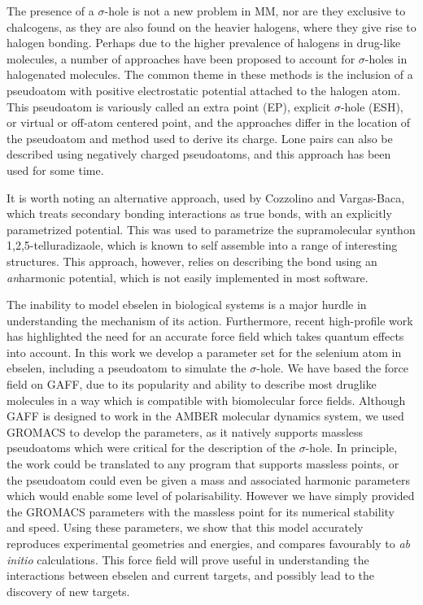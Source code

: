 \begin{refsection}
The presence of a $\sigma$-hole is not a new problem in MM, nor are they exclusive to chalcogens, as they are also found on the heavier halogens, where they give rise to halogen bonding.\autocite{Clark2007}
Perhaps due to the higher prevalence of halogens in drug-like molecules, a number of approaches have been proposed to account for $\sigma$-holes in halogenated molecules.
The common theme in these methods is the inclusion of a pseudoatom with positive electrostatic potential attached to the halogen atom.
This pseudoatom is variously called an extra point (EP), explicit $\sigma$-hole (ESH), or virtual or off-atom centered point, and the approaches differ in the location of the pseudoatom and method used to derive its charge.\autocite{Renidine2011,Ibrahim2011,Hobza2012,Harder2016}
Lone pairs can also be described using negatively charged pseudoatoms, and this approach has been used for some time.\autocite{Dixon1997,Cieplak2001,Harder2016}

It is worth noting an alternative approach, used by Cozzolino and Vargas-Baca, which treats secondary bonding interactions as true bonds, with an explicitly parametrized potential.\autocite{Cozzolino2011}
This was used to parametrize the supramolecular synthon 1,2,5-tellura\-dizaole, which is known to self assemble into a range of interesting structures.
This approach, however, relies on describing the bond using an \emph{an}harmonic potential, which is not easily implemented in most software.

The inability to model ebselen in biological systems is a major hurdle in understanding the mechanism of its action.
Furthermore, recent high-profile work has highlighted the need for an accurate force field which takes quantum effects into account.\autocite{Weglarz-Tomczak2021,Menendez2020}
In this work we develop a parameter set for the selenium atom in ebselen, including a pseudoatom to simulate the $\sigma$-hole.
We have based the force field on GAFF, due to its popularity and ability to describe most druglike molecules in a way which is compatible with biomolecular force fields.
Although GAFF is designed to work in the AMBER molecular dynamics system, we used GROMACS to develop the parameters, as it natively supports massless pseudoatoms which were critical for the description of the $\sigma$-hole.
In principle, the work could be translated to any program that supports massless points, or the pseudoatom could even be given a mass and associated harmonic parameters which would enable some level of polarisability.
However we have simply provided the GROMACS parameters with the massless point for its numerical stability and speed.
Using these parameters, we show that this model accurately reproduces experimental geometries and energies, and compares favourably to \emph{ab initio} calculations.
This force field will prove useful in understanding the interactions between ebselen and current targets, and possibly lead to the discovery of new targets.


\end{refsection}
